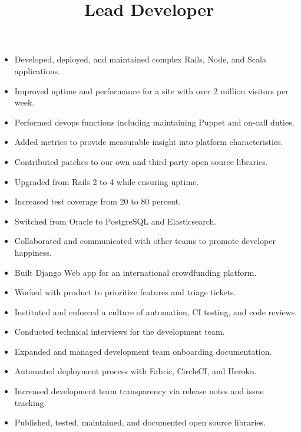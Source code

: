 \documentclass[line]{res}
\begin{document}
\begin{resume}
\begin{position}
\begin{itemize}
\item Developed, deployed, and maintained complex Rails, Node, and Scala applications.
\item Improved uptime and performance for a site with over 2 million visitors per week.
\item Performed devops functions including maintaining Puppet and on-call duties.
\item Added metrics to provide measurable insight into platform characteristics.
\item Contributed patches to our own and third-party open source libraries.
\item Upgraded from Rails 2 to 4 while ensuring uptime.
\item Increased test coverage from 20 to 80 percent.
\item Switched from Oracle to PostgreSQL and Elasticsearch.
\item Collaborated and communicated with other teams to promote developer happiness.

\end{itemize}
\end{position}

\title{Lead Developer}
\begin{position}
\noindent
\vspace {-10 pt}
\begin{itemize}

\item Built Django Web app for an international crowdfunding platform.
\item Worked with product to prioritize features and triage tickets.
\item Instituted and enforced a culture of automation, CI testing, and code reviews.
\item Conducted technical interviews for the development team.
\item Expanded and managed development team onboarding documentation.
\item Automated deployment process with Fabric, CircleCI, and Heroku.
\item Increased development team transparency via release notes and issue tracking.
\item Published, tested, maintained, and documented open source libraries.

\end{itemize}
\end{position}



\end{resume}
\end{document}
